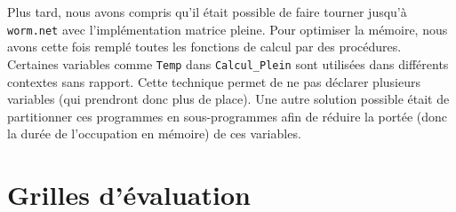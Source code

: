 \documentclass{article}
\begin{document}
Plus tard, nous avons compris qu'il était possible de faire tourner jusqu'à \texttt{worm.net} avec l'implémentation matrice pleine. Pour optimiser la mémoire, nous avons cette fois remplé toutes les fonctions de calcul par des procédures. Certaines variables comme \texttt{Temp} dans \texttt{Calcul\_Plein} sont utilisées dans différents contextes sans rapport. Cette technique permet de ne pas déclarer plusieurs variables (qui prendront donc plus de place). Une autre solution possible était de partitionner ces programmes en sous-programmes afin de réduire la portée (donc la durée de l'occupation en mémoire) de ces variables.


\section{Grilles d'évaluation}
\end{document}
